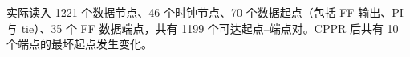 实际读入 1221 个数据节点、46 个时钟节点、70 个数据起点（包括 FF 输出、PI 与 tie）、35 个 FF 数据端点，共有 1199 个可达起点--端点对。CPPR 后共有 10 个端点的最坏起点发生变化。
